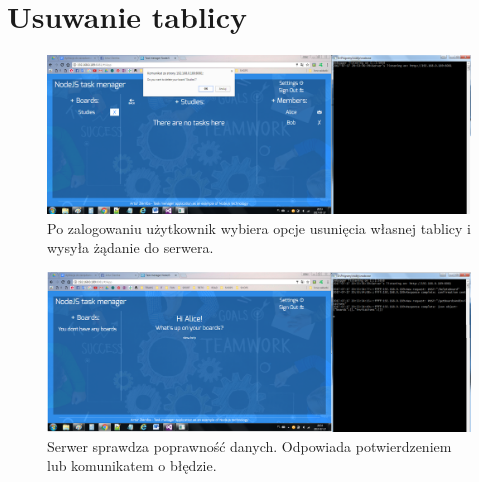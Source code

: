 \documentclass[12pt]{report}
\begin{document}
\section{Usuwanie tablicy}
\begin{figure}[!hb]
\centering
\includegraphics[width=\textwidth,height=\textheight,keepaspectratio]{E1.png}
\captionsetup{labelformat=empty}
\caption[]{Po zalogowaniu użytkownik wybiera opcje usunięcia własnej tablicy i wysyła żądanie do serwera.}
\end{figure}
\begin{figure}[!hb]
\centering
\includegraphics[width=\textwidth,height=\textheight,keepaspectratio]{E2.png}
\captionsetup{labelformat=empty}
\caption[]{Serwer sprawdza poprawność danych. Odpowiada potwierdzeniem lub komunikatem o błędzie.}
\end{figure}
\end{document}
